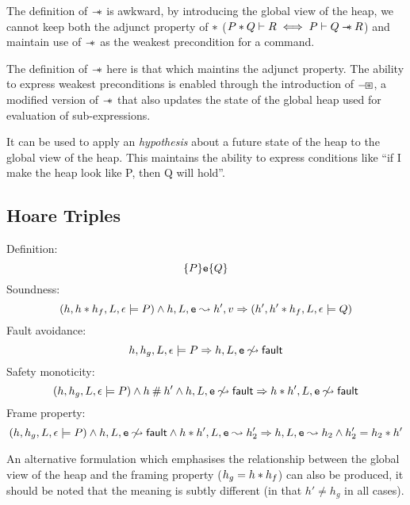 \documentclass[a4paper]{article}
\begin{document}
The definition of $\mathbin{-\mkern-6mu *}$ is awkward, by introducing the global view of the
heap, we cannot keep both the adjunct property of $\mathbin{*}$
($P \mathbin{*} Q \vdash R \iff P \vdash Q \mathbin{-\mkern-6mu *} R$)
and maintain use of $\mathbin{-\mkern-6mu *}$ as the weakest precondition for a command.

The definition of $\mathbin{-\mkern-6mu *}$ here is that which maintins the adjunct property. The
ability to express weakest preconditions is enabled through the introduction
of $\mathbin{-\mkern-3mu \boxast}$, a modified version of $\mathbin{-\mkern-6mu *}$ that also updates the state of the
global heap used for evaluation of sub-expressions.

It can be used to apply
an \emph{hypothesis} about a future state of the heap to the global view of the
heap. This maintains the ability to express conditions like ``if I make
the heap look like P, then Q will hold''.

\subsection{Hoare Triples}
Definition:
\[ \{P\}\mbox{\texttt{{\upshape e}}}\{Q\} \]
Soundness:
\[ (h, h \mathbin{*} h_f, L, \epsilon \models P) \land h, L, \mbox{\texttt{{\upshape e}}} \leadsto h', v
  \Rightarrow (h', h' \mathbin{*} h_f, L, \epsilon \models Q) \]
Fault avoidance:
\[ h, h_g, L, \epsilon \models P \Rightarrow h, L, \mbox{\texttt{{\upshape e}}} \not\leadsto {\ensuremath{\mathsf{fault}}} \]
Safety monoticity:
\[ (h, h_g, L, \epsilon \models P) \land h \mathbin{\#} h' \land h, L, \mbox{\texttt{{\upshape e}}} \not\leadsto
  {\ensuremath{\mathsf{fault}}} \Rightarrow h \mathbin{*} h', L, \mbox{\texttt{{\upshape e}}} \not\leadsto {\ensuremath{\mathsf{fault}}} \]
Frame property:
\[ (h, h_g, L, \epsilon \models P) \land h, L, \mbox{\texttt{{\upshape e}}} \not\leadsto {\ensuremath{\mathsf{fault}}} \land
  h \mathbin{*} h', L, \mbox{\texttt{{\upshape e}}} \leadsto h_2' \Rightarrow h, L, \mbox{\texttt{{\upshape e}}} \leadsto h_2 \land
  h_2' = h_2 \mathbin{*} h' \]

An alternative formulation which emphasises the relationship between the global
view of the heap and the framing property ($h_g = h \mathbin{*} h_f$) can also be
produced, it should be noted that the meaning is subtly different (in that $h'
\neq h_g$ in all cases).
\end{document}
